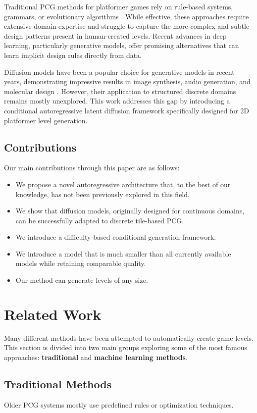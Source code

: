 \documentclass[conference]{IEEEtran}
\begin{document}
Traditional PCG methods for platformer games rely on rule-based systems, grammars, or evolutionary algorithms \cite{shaker2016pcg}. While effective, these approaches require extensive domain expertise and struggle to capture the more complex and subtle design patterns present in human-created levels. Recent advances in deep learning, particularly generative models, offer promising alternatives that can learn implicit design rules directly from data.

Diffusion models have been a popular choice for generative models in recent years, demonstrating impressive results in image synthesis, audio generation, and molecular design \cite{ho2020ddpm}. However, their application to structured discrete domains remains mostly unexplored. This work addresses this gap by introducing a conditional autoregressive latent diffusion framework specifically designed for 2D platformer level generation.

\subsection{Contributions}
Our main contributions through this paper are as follows:
\begin{itemize}
    \item We propose a novel autoregressive architecture that, to the best of our knowledge, has not been previously explored in this field.
    \item We show that diffusion models, originally designed for continuous domains, can be successfully adapted to discrete tile-based PCG.
    \item We introduce a difficulty-based conditional generation framework.
    \item We introduce a model that is much smaller than all currently available models while retaining comparable quality.
    \item Our method can generate levels of any size.
\end{itemize}

\section{Related Work}
Many different methods have been attempted to automatically create game levels. This section is divided into two main groups exploring some of the most famous approaches: \textbf{traditional} and \textbf{machine learning methods}.
    
\subsection{Traditional Methods}
Older PCG systems mostly use predefined rules or optimization techniques.
    
\end{document}
